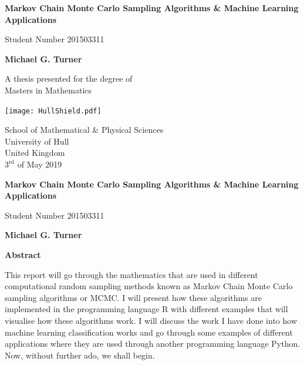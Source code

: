 \documentclass[12pt,twoside]{report}   %
\begin{document}
\begin{titlepage}
    \begin{center}
        \vspace*{1cm}
        
        \Huge
        \textbf{Markov Chain Monte Carlo Sampling Algorithms \& Machine Learning Applications}
        
        \vspace{0.5cm}
        \LARGE
        Student Number 201503311
        
        \vspace{1.5cm}
        
        \textbf{Michael G. Turner}
        
        \vfill
        
        A thesis presented for the degree of\\
        Masters in Mathematics
        
        \vspace{0.8cm}
        
        \texttt{[image: HullShield.pdf]}
        
        \Large
        School of Mathematical \& Physical Sciences\\
        University of Hull\\
        United Kingdom\\
        $3^{\text{rd}}$ of May 2019
        
    \end{center}
\end{titlepage}

\thispagestyle{plain}
\begin{center}
    \Large
    \textbf{Markov Chain Monte Carlo Sampling Algorithms \& Machine Learning Applications}
    
    \vspace{0.4cm}
    \large
    Student Number 201503311
    
    \vspace{0.4cm}
    \textbf{Michael G. Turner}
    
    \vspace{0.9cm}
    \textbf{Abstract}
\end{center}

This report will go through the mathematics that are used in different computational random sampling methods known as Markov Chain Monte Carlo sampling algorithms or MCMC. I will present how these algorithms are implemented in the programming language R with different examples that will visualise how these algorithms work. I will discuss the work I have done into how machine learning classification works and go through some examples of different applications where they are used through another programming language Python. Now, without further ado, we shall begin.
\end{document}

